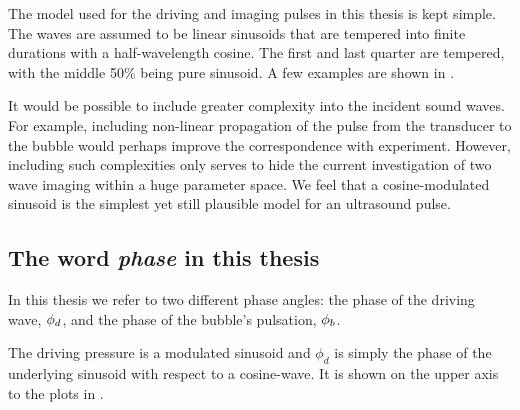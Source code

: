 The model used for the  driving and imaging pulses in this thesis is kept simple.
The waves are assumed to be linear sinusoids that are tempered
into finite durations with a half-wavelength cosine.
The first and last quarter are tempered,
with the middle 50\% being pure sinusoid.
A few examples are shown in .



It would be possible to include greater complexity into the incident sound waves.
For example, including non-linear propagation of the pulse from the transducer to the bubble
would perhaps improve the correspondence with experiment.
However, including such complexities only serves to  hide the current investigation of two wave imaging 
within a huge parameter space.
We feel that a cosine-modulated sinusoid
is the simplest yet still plausible model for an ultrasound pulse.

\subsection{The word {\em phase} in this thesis}\label{sec:comp:phase}


In this thesis we refer to two different phase angles:
the phase of the driving wave, ${\phi_d}$, and the phase of the bubble's pulsation, ${\phi_b}$.

The driving pressure is a modulated sinusoid  and $\phi_d$ is simply the phase of the underlying sinusoid
with respect to a cosine-wave.
It is shown on the upper axis to the plots in .




